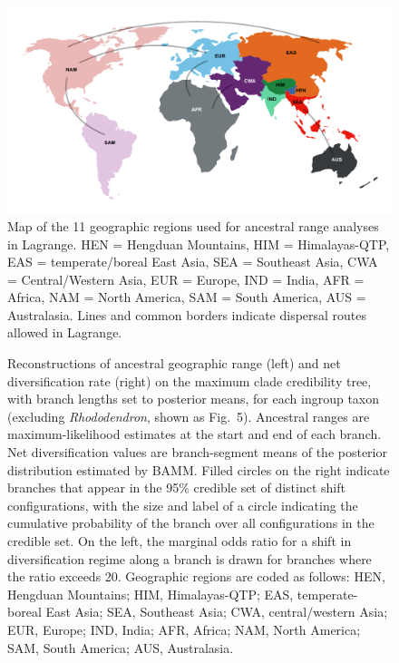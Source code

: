 \begin{figure}
\centering
\includegraphics[width=.99\linewidth]{figures/regions.pdf}
\caption{Map of the 11 geographic regions used for ancestral range
  analyses in Lagrange.  HEN = Hengduan Mountains, HIM =
  Himalayas-QTP, EAS = temperate/boreal East Asia, SEA = Southeast
  Asia, CWA = Central/Western Asia, EUR = Europe, IND = India, AFR =
  Africa, NAM = North America, SAM = South America, AUS =
  Australasia. Lines and common borders indicate dispersal routes
  allowed in Lagrange.}
\label{fig:regions}
\end{figure}

\begin{figure}
  \caption{Reconstructions of ancestral geographic range (left) and
    net diversification rate (right) on the maximum clade credibility
    tree, with branch lengths set to posterior means, for each ingroup
    taxon (excluding \textit{Rhododendron}, shown as
    Fig.~5). Ancestral ranges are maximum-likelihood estimates at the
    start and end of each branch. Net diversification values are
    branch-segment means of the posterior distribution estimated by
    BAMM. Filled circles on the right indicate branches that appear in
    the 95\% credible set of distinct shift configurations, with the
    size and label of a circle indicating the cumulative probability
    of the branch over all configurations in the credible set. On the
    left, the marginal odds ratio for a shift in diversification
    regime along a branch is drawn for branches where the ratio
    exceeds 20. Geographic regions are coded as follows: HEN, Hengduan
    Mountains; HIM, Himalayas-QTP; EAS, temperate-boreal East Asia;
    SEA, Southeast Asia; CWA, central/western Asia; EUR, Europe; IND,
    India; AFR, Africa; NAM, North America; SAM, South America; AUS,
    Australasia.}
  \label{fig:ancranges}
\end{figure}


